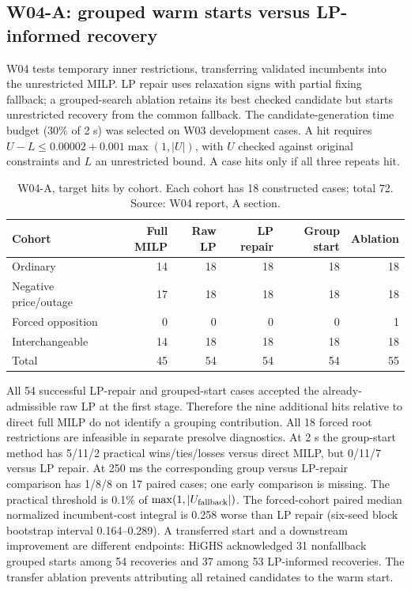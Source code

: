\documentclass[11pt,letterpaper]{article}
\begin{document}
\subsection{W04-A: grouped warm starts versus LP-informed recovery}
W04 tests temporary inner restrictions, transferring validated incumbents into the unrestricted MILP. LP repair uses relaxation signs with partial fixing fallback; a grouped-search ablation retains its best checked candidate but starts unrestricted recovery from the common fallback. The candidate-generation time budget (30\% of 2 s) was selected on W03 development cases. A hit requires $U-L\le 0.00002+0.001\max(1,|U|)$, with $U$ checked against original constraints and $L$ an unrestricted bound. A case hits only if all three repeats hit.

\begin{table}[htbp]\centering\small
\caption{W04-A, target hits by cohort. Each cohort has 18 constructed cases; total 72. Source: W04 report, A section.}
\begin{tabular}{lrrrrr}\toprule
Cohort & Full MILP & Raw LP & LP repair & Group start & Ablation\\\midrule
Ordinary &14&18&18&18&18\\
Negative price/outage &17&18&18&18&18\\
Forced opposition &0&0&0&0&1\\
Interchangeable &14&18&18&18&18\\\midrule
Total &45&54&54&54&55\\\bottomrule
\end{tabular}
\end{table}

All 54 successful LP-repair and grouped-start cases accepted the already-admissible raw LP at the first stage. Therefore the nine additional hits relative to direct full MILP do not identify a grouping contribution. All 18 forced root restrictions are infeasible in separate presolve diagnostics. At 2 s the group-start method has 5/11/2 practical wins/ties/losses versus direct MILP, but 0/11/7 versus LP repair. At 250 ms the corresponding group versus LP-repair comparison has 1/8/8 on 17 paired cases; one early comparison is missing. The practical threshold is 0.1\% of $\max(1,|U_{\rm fallback}|)$. The forced-cohort paired median normalized incumbent-cost integral is 0.258 worse than LP repair (six-seed block bootstrap interval 0.164--0.289). A transferred start and a downstream improvement are different endpoints: HiGHS acknowledged 31 nonfallback grouped starts among 54 recoveries and 37 among 53 LP-informed recoveries. The transfer ablation prevents attributing all retained candidates to the warm start.
\end{document}
